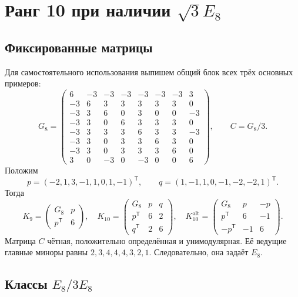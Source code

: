 \documentclass[11pt,a4paper]{article}
\theoremstyle{remark}\newtheorem{remark}[theorem]{Замечание}
\newcommand{\Kalt}{K_{10}^{\mathrm{alt}}}
\begin{document}
\section{Ранг 10 при наличии \texorpdfstring{$\sqrt3E_8$}{sqrt(3)E8}}

\subsection{Фиксированные матрицы}

Для самостоятельного использования выпишем общий блок всех трёх основных примеров:
\[
G_8=\begin{pmatrix}
6&-3&-3&-3&-3&-3&-3&3\\
-3&6&3&3&3&3&3&0\\
-3&3&6&0&3&0&0&-3\\
-3&3&0&6&3&3&3&0\\
-3&3&3&3&6&3&3&-3\\
-3&3&0&3&3&6&3&0\\
-3&3&0&3&3&3&6&0\\
3&0&-3&0&-3&0&0&6
\end{pmatrix},\qquad C=G_8/3.
\]
Положим
\[
p=(-2,1,3,-1,1,0,1,-1)^{\mathsf T},\qquad
q=(1,-1,1,0,-1,-2,-2,1)^{\mathsf T}.
\]
Тогда
\begin{equation}\label{eq:examples}
K_9=\begin{pmatrix}G_8&p\\p^{\mathsf T}&6\end{pmatrix},\quad
K_{10}=\begin{pmatrix}G_8&p&q\\p^{\mathsf T}&6&2\\q^{\mathsf T}&2&6\end{pmatrix},\quad
\Kalt=\begin{pmatrix}G_8&p&-p\\p^{\mathsf T}&6&-1\\-p^{\mathsf T}&-1&6\end{pmatrix}.
\end{equation}
Матрица $C$ чётная, положительно определённая и унимодулярная. Её ведущие главные миноры равны $2,3,4,4,4,3,2,1$. Следовательно, она задаёт $E_8$.

\subsection{Классы \texorpdfstring{$E_8/3E_8$}{E8/3E8}}
\end{document}
